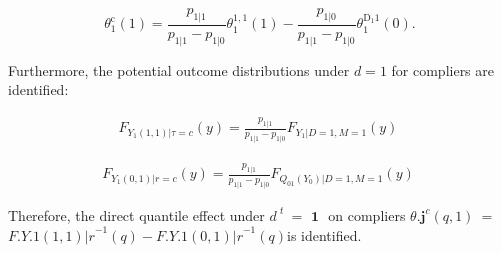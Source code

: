 \documentclass{article}
\begin{document}
\begin{equation}
\theta _ { 1 } ^ { \mathrm { c } } ( 1 ) = \frac { p _ { 1 | 1 } } { p _ { 1 | 1 } - p _ { 1 | 0 } } \theta _ { 1 } ^ { 1, 1 } ( 1 ) - \frac { p _ { 1 | 0 } } { p _ { 1 | 1 } - p _ { 1 | 0 } } \theta _ { 1 } ^ { \mathrm { D } _ { 1 } 1 } ( 0 ).
\end{equation}


Furthermore, the potential outcome distributions under $d = 1$ for compliers
are identified:


\begin{equation}
\begin{array} { c } { F _ { Y _ { 1 } ( 1, 1 ) | \tau = c } ( y ) = \frac { p _ { 1 | 1 } } { p _ { 1 | 1 } - p _ { 1 | 0 } } F _ { Y _ { 1 } | D = 1, M = 1 } ( y ) ~ }\end{array}
\end{equation}


\begin{equation}
\begin{array} { c } { F _ { Y _ { 1 } ( 0, 1 ) | r = c } ( y ) = \frac { p _ { 1 | 1 } } { p _ { 1 | 1 } - p _ { 1 | 0 } } F _ { Q _ { 0 1 } ( Y _ { 0 } ) | D = 1, M = 1 } ( y ) ~ }\end{array}
\end{equation}


Therefore, the direct quantile effect under $d ^ { \textit { t } } = \textbf { 1 }$ on compliers $\theta . { \mathbf { j } } ^ { c } ( q, 1 ) ~ =$
$F . { Y . { 1 } ( 1, 1 ) | r } ^ { - 1 } ( q ) - F . { Y . { 1 } ( 0, 1 ) | r } ^ { - 1 } ( q )$is identified.
\end{document}
